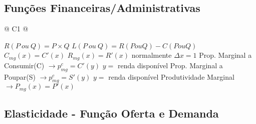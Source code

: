 	\subsection{Funções Financeiras/Administrativas}

		\begin{longtable}{
		@{}
		C{1\textwidth} 
		@{}}

			\toprule
			{\large $R(P \ ou \ Q) = P \times Q$ \hspace{1cm} $L(P \ ou \ Q) = R(P ou Q) - C (P ou Q)$}
			\tabularnewline
			\midrule
			{\large $C_{mg}(x) = C'(x)$ \hspace{1cm} $R_{mg}(x) = R'(x)$ \hspace{1cm}  normalmente $\Delta x = 1$}
			\tabularnewline
			\midrule
			{\large Prop. Marginal a Consumir(C) $\rightarrow p^{c}_{mg} = C'(y)$ \hspace{1cm} $y =$ renda disponível}
			\tabularnewline
			\midrule
			{\large Prop. Marginal a Poupar(S) $\rightarrow  p^{c}_{mg} = S'(y)$ \hspace{1cm} $y =$ renda disponível}
			\tabularnewline
			\midrule
			{\large Produtividade Marginal $\rightarrow P_{mg}(x) = P'(x)$}
			\tabularnewline
			\bottomrule

		\end{longtable}

	\subsection{Elasticidade - Função Oferta e Demanda}

